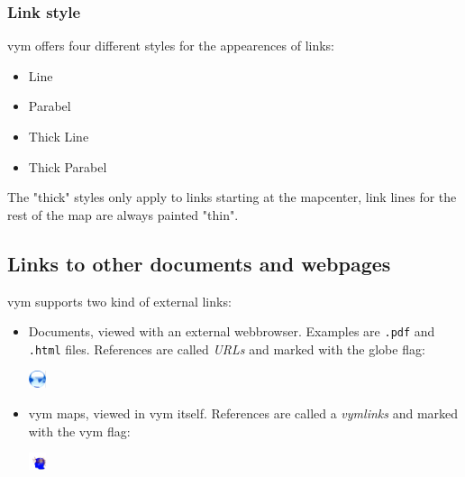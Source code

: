 \documentclass[12pt,a4paper]{article}
\newcommand{\vym}{{\sc vym }}
\begin{document}
\subsubsection*{Link style}
\vym offers four different styles for the appearences of links:
\begin{itemize}
    \item Line
    \item Parabel
    \item Thick Line
    \item Thick Parabel
\end{itemize}
The "thick" styles only apply to links starting at the mapcenter, link
lines for the rest of the map are always painted "thin".

\subsection{Links to other documents and webpages}
\vym supports two kind of external links:
\begin{itemize}
    \item Documents, viewed with an external webbrowser.
    Examples are {\tt .pdf} and {\tt .html} files. References 
    are called {\em URLs} and marked with the globe
    flag:
    \begin{center}
	\includegraphics[width=0.5cm]{images/flag-url.png}
    \end{center}

    \item \vym maps, viewed in \vym itself. References are called
    a {\em vymlinks} and marked with the \vym flag:
    \begin{center}
	\includegraphics[width=0.5cm]{images/flag-vymlink.png}
    \end{center}
\end{itemize}
\end{document}
